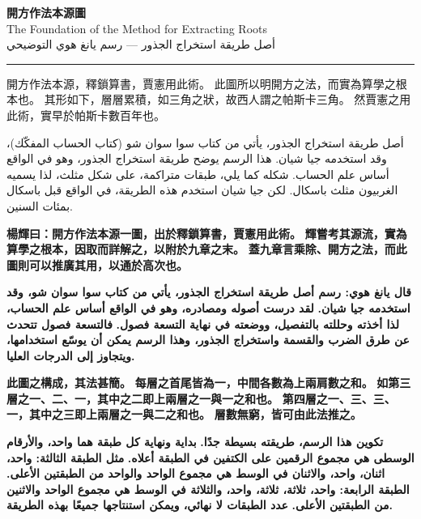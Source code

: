 \documentclass[11pt,a4paper]{article}
\newcommand{\ar}[1]{\arabicfont\beginR #1\endR}
\newcommand{\bilingualrow}[2]{%
\noindent\begin{minipage}[t]{0.48\textwidth}#1\end{minipage}\hfill\begin{minipage}[t]{0.48\textwidth}\arabicfont\beginR #2\endR\end{minipage}\par\vspace{0.5cm}}
\begin{document}
\begin{center}
{\LARGE\bfseries\color{titlecolor} 開方作法本源圖}\\[0.5cm]
{\large\color{sectioncolor} The Foundation of the Method for Extracting Roots}\\[0.3cm]
{\large\color{titlecolor} \ar{أصل طريقة استخراج الجذور — رسم يانغ هوي التوضيحي}}\\[0.5cm]
\end{center}

\begin{center}
\rule{0.6\textwidth}{0.8pt}
\end{center}

\vspace{0.5em}

\bilingualrow{
開方作法本源，釋鎖算書，賈憲用此術。
此圖所以明開方之法，而實為算學之根本也。
其形如下，層層累積，如三角之狀，故西人謂之帕斯卡三角。
然賈憲之用此術，實早於帕斯卡數百年也。
}{
أصل طريقة استخراج الجذور، يأتي من كتاب سوا سوان شو (كتاب الحساب المفكّك)، وقد استخدمه جيا شيان.
هذا الرسم يوضح طريقة استخراج الجذور، وهو في الواقع أساس علم الحساب.
شكله كما يلي، طبقات متراكمة، على شكل مثلث، لذا يسميه الغربيون مثلث باسكال.
لكن جيا شيان استخدم هذه الطريقة، في الواقع قبل باسكال بمئات السنين.
}

\vspace{0.5em}

\bilingualrow{
\textbf{\color{commentarycolor}楊輝曰：開方作法本源一圖，出於釋鎖算書，賈憲用此術。}
\textbf{\color{commentarycolor}輝嘗考其源流，實為算學之根本，因取而詳解之，以附於九章之末。}
\textbf{\color{commentarycolor}蓋九章言乘除、開方之法，而此圖則可以推廣其用，以通於高次也。}
}{
\textbf{\color{commentarycolor}قال يانغ هوي: رسم أصل طريقة استخراج الجذور، يأتي من كتاب سوا سوان شو، وقد استخدمه جيا شيان.}
\textbf{\color{commentarycolor}لقد درست أصوله ومصادره، وهو في الواقع أساس علم الحساب، لذا أخذته وحللته بالتفصيل، ووضعته في نهاية التسعة فصول.}
\textbf{\color{commentarycolor}فالتسعة فصول تتحدث عن طرق الضرب والقسمة واستخراج الجذور، وهذا الرسم يمكن أن يوسّع استخدامها، ويتجاوز إلى الدرجات العليا.}
}

\vspace{0.5em}

\bilingualrow{
\textbf{\color{commentarycolor}此圖之構成，其法甚簡。}
\textbf{\color{commentarycolor}每層之首尾皆為一，中間各數為上兩肩數之和。}
\textbf{\color{commentarycolor}如第三層之一、二、一，其中之二即上兩層之一與一之和也。}
\textbf{\color{commentarycolor}第四層之一、三、三、一，其中之三即上兩層之一與二之和也。}
\textbf{\color{commentarycolor}層數無窮，皆可由此法推之。}
}{
\textbf{\color{commentarycolor}تكوين هذا الرسم، طريقته بسيطة جدًا.}
\textbf{\color{commentarycolor}بداية ونهاية كل طبقة هما واحد، والأرقام الوسطى هي مجموع الرقمين على الكتفين في الطبقة أعلاه.}
\textbf{\color{commentarycolor}مثل الطبقة الثالثة: واحد، اثنان، واحد، والاثنان في الوسط هي مجموع الواحد والواحد من الطبقتين الأعلى.}
\textbf{\color{commentarycolor}الطبقة الرابعة: واحد، ثلاثة، ثلاثة، واحد، والثلاثة في الوسط هي مجموع الواحد والاثنين من الطبقتين الأعلى.}
\textbf{\color{commentarycolor}عدد الطبقات لا نهائي، ويمكن استنتاجها جميعًا بهذه الطريقة.}
}
\end{document}
